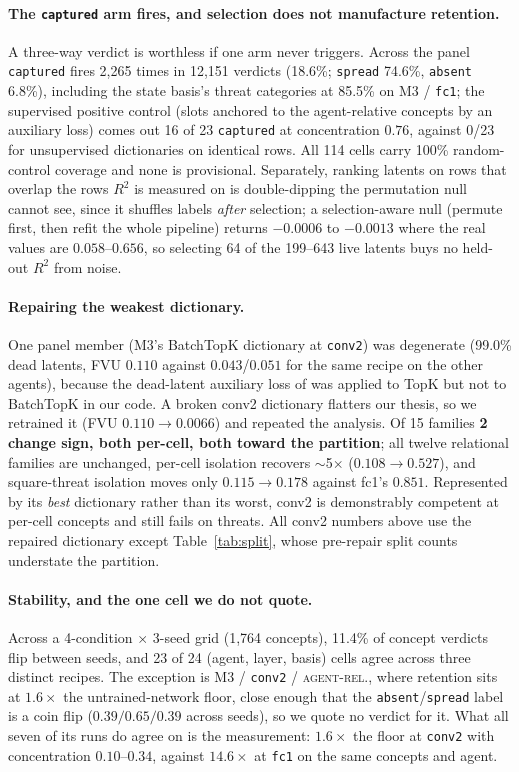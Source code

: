 \documentclass{article}
\begin{document}
\paragraph{The \texttt{captured} arm fires, and selection does not manufacture
  retention.} A three-way verdict is worthless if one arm never triggers. Across
the panel \texttt{captured} fires 2{,}265 times in 12{,}151 verdicts (18.6\%;
\texttt{spread} 74.6\%, \texttt{absent} 6.8\%), including the state basis's threat
categories at 85.5\% on M3 / \texttt{fc1}; the supervised positive control (slots
anchored to the agent-relative concepts by an auxiliary loss) comes out 16 of
23 \texttt{captured} at concentration $0.76$, against 0/23 for unsupervised
dictionaries on identical rows. All 114 cells carry 100\% random-control
coverage and none is provisional. Separately, ranking latents on rows that
overlap the rows $R^2$ is measured on is double-dipping the permutation null
cannot see, since it shuffles labels \emph{after} selection; a selection-aware
null (permute first, then refit the whole pipeline) returns $-0.0006$ to
$-0.0013$ where the real values are $0.058$--$0.656$, so selecting 64 of the
199--643 live latents buys no held-out $R^2$ from noise.

\paragraph{Repairing the weakest dictionary.} One panel member (M3's BatchTopK
dictionary at \texttt{conv2}) was degenerate (99.0\% dead latents, FVU $0.110$
against $0.043$/$0.051$ for the same recipe on the other agents), because the
dead-latent auxiliary loss of \citet{gao2024scaling} was applied to TopK but not
to BatchTopK in our code. A broken conv2 dictionary flatters our thesis, so we
retrained it (FVU $0.110 \to 0.0066$) and repeated the analysis. Of 15 families
\textbf{2 change sign, both per-cell, both toward the partition}; all twelve
relational families are unchanged, per-cell isolation recovers $\sim$5$\times$
($0.108 \to 0.527$), and square-threat isolation moves only $0.115 \to 0.178$
against fc1's $0.851$. Represented by its \emph{best} dictionary rather than its
worst, conv2 is demonstrably competent at per-cell concepts and still fails on
threats. All conv2 numbers above use the repaired dictionary except
Table~\ref{tab:split}, whose pre-repair split counts understate the partition.

\paragraph{Stability, and the one cell we do not quote.} Across a 4-condition
$\times$ 3-seed grid (1{,}764 concepts), 11.4\% of concept verdicts flip between
seeds, and 23 of 24 (agent, layer, basis) cells agree across three distinct
recipes. The exception is M3 / \texttt{conv2} / \textsc{agent-rel.}, where
retention sits at $1.6\times$ the untrained-network floor, close enough that
the \texttt{absent}/\texttt{spread} label is a coin flip
($0.39/0.65/0.39$ across seeds), so we quote no verdict for it. What all seven
of its runs do agree on is the measurement: $1.6\times$ the floor at
\texttt{conv2} with concentration $0.10$--$0.34$, against $14.6\times$ at
\texttt{fc1} on the same concepts and agent.
\end{document}
